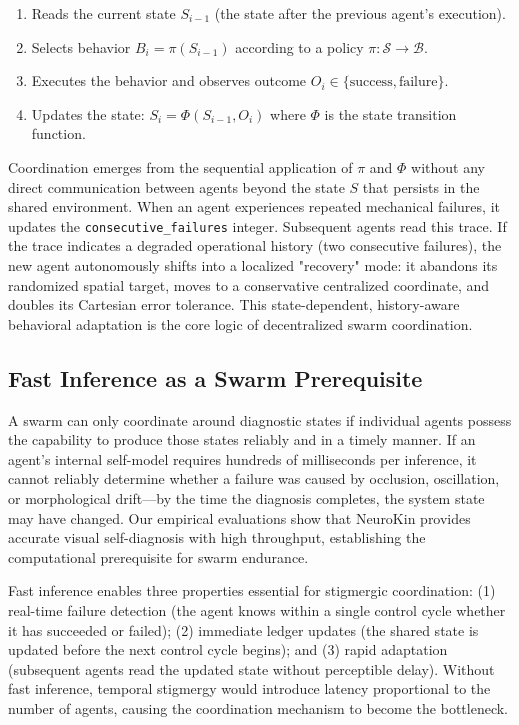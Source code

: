 \documentclass[12pt,a4paper,oneside]{report}
\begin{document}
\begin{enumerate}
    \item Reads the current state $S_{i-1}$ (the state after the previous agent's execution).
    \item Selects behavior $B_i = \pi(S_{i-1})$ according to a policy $\pi: \mathcal{S} \rightarrow \mathcal{B}$.
    \item Executes the behavior and observes outcome $O_i \in \{\text{success}, \text{failure}\}$.
    \item Updates the state: $S_i = \Phi(S_{i-1}, O_i)$ where $\Phi$ is the state transition function.
\end{enumerate}

Coordination emerges from the sequential application of $\pi$ and $\Phi$ without any direct communication between agents beyond the state $S$ that persists in the shared environment. When an agent experiences repeated mechanical failures, it updates the \texttt{consecutive\_failures} integer. Subsequent agents read this trace. If the trace indicates a degraded operational history (two consecutive failures), the new agent autonomously shifts into a localized "recovery" mode: it abandons its randomized spatial target, moves to a conservative centralized coordinate, and doubles its Cartesian error tolerance. This state-dependent, history-aware behavioral adaptation is the core logic of decentralized swarm coordination.

\subsection{Fast Inference as a Swarm Prerequisite}
\label{subsec:fast_inference_as_a_swarm_prerequisite}

A swarm can only coordinate around diagnostic states if individual agents possess the capability to produce those states reliably and in a timely manner. If an agent's internal self-model requires hundreds of milliseconds per inference, it cannot reliably determine whether a failure was caused by occlusion, oscillation, or morphological drift—by the time the diagnosis completes, the system state may have changed. Our empirical evaluations show that NeuroKin provides accurate visual self-diagnosis with high throughput, establishing the computational prerequisite for swarm endurance.

Fast inference enables three properties essential for stigmergic coordination: (1) real-time failure detection (the agent knows within a single control cycle whether it has succeeded or failed); (2) immediate ledger updates (the shared state is updated before the next control cycle begins); and (3) rapid adaptation (subsequent agents read the updated state without perceptible delay). Without fast inference, temporal stigmergy would introduce latency proportional to the number of agents, causing the coordination mechanism to become the bottleneck.
\end{document}

